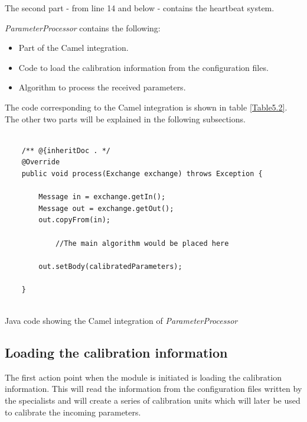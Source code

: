 The second part - from line 14 and below - contains the heartbeat system.


\emph{ParameterProcessor} contains the following:
\begin{itemize}
\item Part of the Camel integration.
\item Code to load the calibration information from the configuration files.
\item Algorithm to process the received parameters.
\end{itemize}

The code corresponding to the Camel integration is shown in table \ref{Table5.2}. The other two parts will be explained in the following subsections.

\begin{table}[h]
\lstset{language=Java}
\begin{lstlisting}

    /** @{inheritDoc . */
    @Override
    public void process(Exchange exchange) throws Exception {

        Message in = exchange.getIn();
        Message out = exchange.getOut();
        out.copyFrom(in);

    		//The main algorithm would be placed here    

        out.setBody(calibratedParameters);

	}


\end{lstlisting}
\caption{Java code showing the Camel integration of \emph{ParameterProcessor} }
\label{Table5.2}
\end{table}

\subsection{Loading the calibration information}

The first action point when the module is initiated is loading the calibration information. This will read the information from the configuration files written by the specialists and will create a series of calibration units which will later be used to calibrate the incoming parameters.

